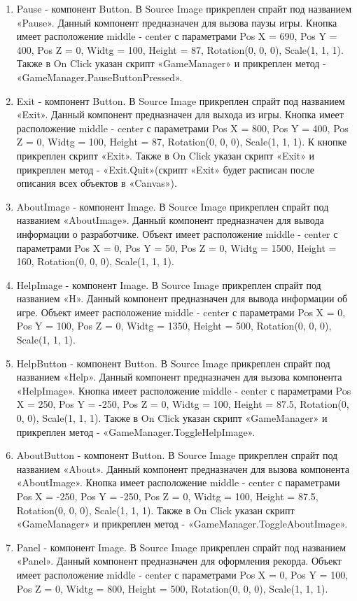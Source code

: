 \documentclass[14pt, oneside]{altsu-report}
\begin{document}
\begin{enumerate}
\item Pause - компонент Button. В Source Image прикреплен спрайт под названием «Pause». Данный компонент предназначен для вызова паузы игры. Кнопка имеет расположение middle - center с параметрами Pos X = 690, Pos Y = 400, Pos Z = 0, Widtg = 100, Height = 87, Rotation(0, 0, 0), Scale(1, 1, 1). Также в On Click указан скрипт «GameManager» и прикреплен метод - «GameManager.PauseButtonPressed».
\item Exit - компонент Button. В Source Image прикреплен спрайт под названием «Exit». Данный компонент предназначен для выхода из игры. Кнопка имеет расположение middle - center с параметрами Pos X = 800, Pos Y = 400, Pos Z = 0, Widtg = 100, Height = 87, Rotation(0, 0, 0), Scale(1, 1, 1). К кнопке прикреплен скрипт «Exit». Также в On Click указан скрипт «Exit» и прикреплен метод - «Exit.Quit»(скрипт «Exit» будет расписан после описания всех объектов в «Canvas»). 
\item AboutImage - компонент Image. В Source Image прикреплен спрайт под названием «AboutImage». Данный компонент предназначен для вывода информации о разработчике. Объект имеет расположение middle - center с параметрами Pos X = 0, Pos Y = 50, Pos Z = 0, Widtg = 1500, Height = 160, Rotation(0, 0, 0), Scale(1, 1, 1). 
\item HelpImage - компонент Image. В Source Image прикреплен спрайт под названием «H». Данный компонент предназначен для вывода информации об игре. Объект имеет расположение middle - center с параметрами Pos X = 0, Pos Y = 100, Pos Z = 0, Widtg = 1350, Height = 500, Rotation(0, 0, 0), Scale(1, 1, 1). 
\item HelpButton - компонент Button. В Source Image прикреплен спрайт под названием «Help». Данный компонент предназначен для вызова компонента «HelpImage». Кнопка имеет расположение middle - center с параметрами Pos X = 250, Pos Y = -250, Pos Z = 0, Widtg = 100, Height = 87.5, Rotation(0, 0, 0), Scale(1, 1, 1). Также в On Click указан скрипт «GameManager» и прикреплен метод - «GameManager.ToggleHelpImage».
\item AboutButton - компонент Button. В Source Image прикреплен спрайт под названием «About». Данный компонент предназначен для вызова компонента «AboutImage». Кнопка имеет расположение middle - center с параметрами Pos X = -250, Pos Y = -250, Pos Z = 0, Widtg = 100, Height = 87.5, Rotation(0, 0, 0), Scale(1, 1, 1). Также в On Click указан скрипт «GameManager» и прикреплен метод - «GameManager.ToggleAboutImage».
\item Panel - компонент Image. В Source Image прикреплен спрайт под названием «Panel». Данный компонент предназначен для оформления рекорда. Объект имеет расположение middle - center с параметрами Pos X = 0, Pos Y = 100, Pos Z = 0, Widtg = 800, Height = 500, Rotation(0, 0, 0), Scale(1, 1, 1). 

\end{enumerate}
\end{document}
